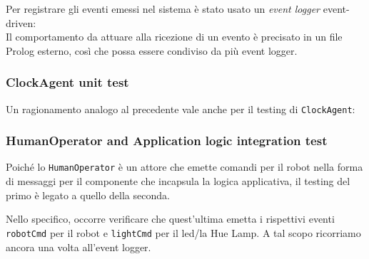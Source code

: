 \documentclass{../llncs}
\newcommand{\codescript}[1]{{\mbox{\small{\texttt{#1}}}}\xspace}
\begin{document}


Per registrare gli eventi emessi nel sistema è stato usato un \emph{event logger} event-driven:\\





Il comportamento da attuare alla ricezione di un evento è precisato in un file Prolog esterno, così che possa essere condiviso da più event logger.\\



\subsubsection{ClockAgent unit test}
Un ragionamento analogo al precedente vale anche per il testing di \codescript{ClockAgent}:\\



\subsubsection{HumanOperator and Application logic integration test}
Poiché lo \codescript{HumanOperator} è un attore che emette comandi per il robot nella forma di messaggi per il componente che incapsula la logica applicativa, il testing del primo è legato a quello della seconda.

Nello specifico, occorre verificare che quest'ultima emetta i rispettivi eventi \codescript{robotCmd} per il robot e \codescript{lightCmd} per il led/la Hue Lamp. A tal scopo ricorriamo ancora una volta all'event logger.\\


\end{document}
